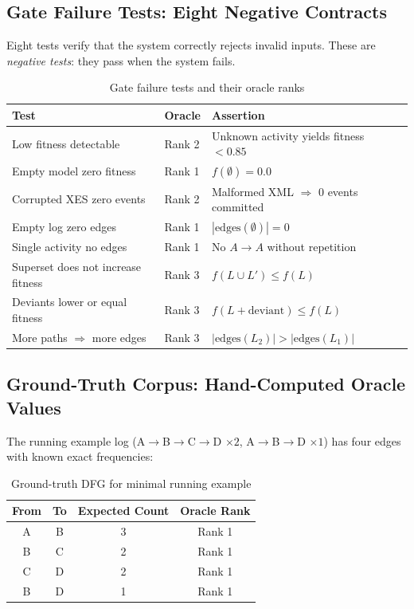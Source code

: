 \documentclass[12pt,a4paper]{article}
\begin{document}
\subsection{Gate Failure Tests: Eight Negative Contracts}

Eight tests verify that the system correctly rejects invalid inputs. These are
\emph{negative tests}: they pass when the system fails.

\begin{table}[H]
  \centering
  \caption{Gate failure tests and their oracle ranks}
  \label{tab:gates}
  \begin{tabular}{lll}
    \toprule
    \textbf{Test} & \textbf{Oracle} & \textbf{Assertion} \\
    \midrule
    Low fitness detectable & Rank 2 & Unknown activity yields fitness $< 0.85$ \\
    Empty model zero fitness & Rank 1 & $f(\emptyset) = 0.0$ \\
    Corrupted XES zero events & Rank 2 & Malformed XML $\Rightarrow$ 0 events committed \\
    Empty log zero edges & Rank 1 & $|\text{edges}(\emptyset)| = 0$ \\
    Single activity no edges & Rank 1 & No $A \to A$ without repetition \\
    Superset does not increase fitness & Rank 3 & $f(L \cup L') \le f(L)$ \\
    Deviants lower or equal fitness & Rank 3 & $f(L + \text{deviant}) \le f(L)$ \\
    More paths $\Rightarrow$ more edges & Rank 3 & $|\text{edges}(L_2)| > |\text{edges}(L_1)|$ \\
    \bottomrule
  \end{tabular}
\end{table}

\subsection{Ground-Truth Corpus: Hand-Computed Oracle Values}

The running example log (A$\to$B$\to$C$\to$D $\times 2$, A$\to$B$\to$D $\times 1$) has
four edges with known exact frequencies:

\begin{table}[H]
  \centering
  \caption{Ground-truth DFG for minimal running example}
  \label{tab:groundtruth}
  \begin{tabular}{cccc}
    \toprule
    \textbf{From} & \textbf{To} & \textbf{Expected Count} & \textbf{Oracle Rank} \\
    \midrule
    A & B & 3 & Rank 1 \\
    B & C & 2 & Rank 1 \\
    C & D & 2 & Rank 1 \\
    B & D & 1 & Rank 1 \\
    \bottomrule
  \end{tabular}
\end{table}
\end{document}
